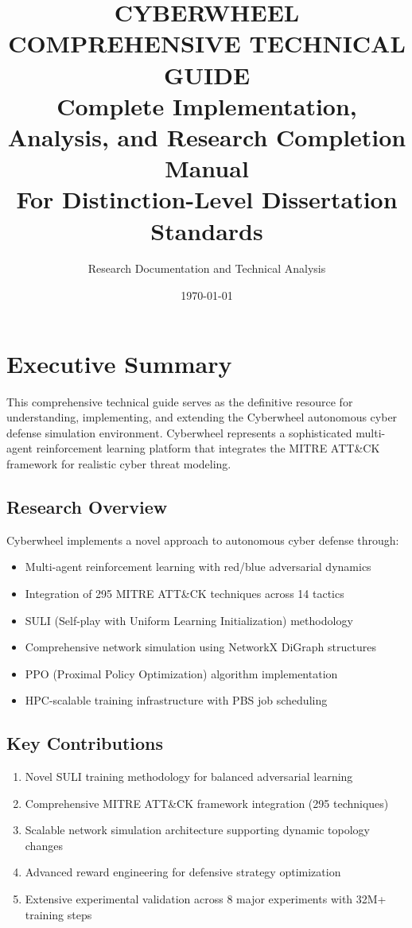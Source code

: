 \documentclass[12pt,a4paper]{article}
\title{\textbf{CYBERWHEEL COMPREHENSIVE TECHNICAL GUIDE}\\
\Large Complete Implementation, Analysis, and Research Completion Manual\\
\large For Distinction-Level Dissertation Standards}
\author{Research Documentation and Technical Analysis}
\date{\today}
\begin{document}
\maketitle
\newpage

\tableofcontents
\newpage

\section{Executive Summary}

This comprehensive technical guide serves as the definitive resource for understanding, implementing, and extending the Cyberwheel autonomous cyber defense simulation environment. Cyberwheel represents a sophisticated multi-agent reinforcement learning platform that integrates the MITRE ATT\&CK framework for realistic cyber threat modeling.

\subsection{Research Overview}
Cyberwheel implements a novel approach to autonomous cyber defense through:
\begin{itemize}
    \item Multi-agent reinforcement learning with red/blue adversarial dynamics
    \item Integration of 295 MITRE ATT\&CK techniques across 14 tactics
    \item SULI (Self-play with Uniform Learning Initialization) methodology
    \item Comprehensive network simulation using NetworkX DiGraph structures
    \item PPO (Proximal Policy Optimization) algorithm implementation
    \item HPC-scalable training infrastructure with PBS job scheduling
\end{itemize}

\subsection{Key Contributions}
\begin{enumerate}
    \item Novel SULI training methodology for balanced adversarial learning
    \item Comprehensive MITRE ATT\&CK framework integration (295 techniques)
    \item Scalable network simulation architecture supporting dynamic topology changes
    \item Advanced reward engineering for defensive strategy optimization
    \item Extensive experimental validation across 8 major experiments with 32M+ training steps
\end{enumerate}
\end{document}
